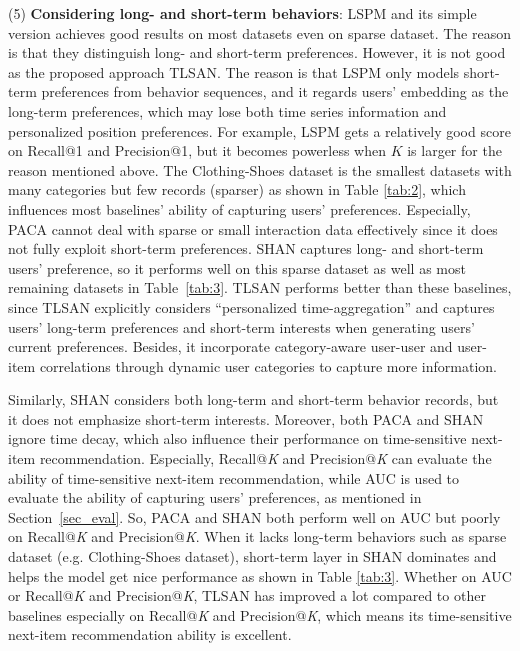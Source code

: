\documentclass[preprint,12pt]{elsarticle}
\newcommand{\tool}{TLSAN\xspace}
\begin{document}
\begin{sloppypar}
(5) \textbf{Considering long- and short-term behaviors}: LSPM and its simple version achieves good results on most datasets even on sparse dataset. The reason is that they distinguish long- and short-term preferences. However, it is not good as the proposed approach \tool. The reason is that LSPM only models short-term preferences from behavior sequences, and it regards users' embedding as the long-term preferences, which may lose both time series information and personalized position preferences. For example, LSPM gets a relatively good score on Recall@1 and Precision@1, but it becomes powerless when $K$ is larger for the reason mentioned above. The Clothing-Shoes dataset is the smallest datasets with many categories but few records (sparser) as shown in Table \ref{tab:2}, which influences most baselines' ability of capturing users' preferences. Especially, PACA cannot deal with sparse or small interaction data effectively since it does not fully exploit short-term preferences. SHAN captures long- and short-term users' preference, so it performs well on this sparse dataset as well as most remaining datasets in Table~\ref{tab:3}. \tool performs better than these baselines, since \tool explicitly considers ``personalized time-aggregation'' and captures users' long-term preferences and short-term interests when generating users' current preferences. Besides, it incorporate category-aware user-user and user-item correlations through dynamic user categories to capture more information. 

Similarly, SHAN considers both long-term and short-term behavior records, but it does not emphasize short-term interests. 
Moreover, both PACA and SHAN ignore time decay, which also influence their performance on time-sensitive next-item recommendation. Especially, Recall@\emph{K} and Precision@\emph{K} can evaluate the ability of time-sensitive next-item recommendation, while AUC is used to evaluate the ability of capturing users' preferences, as mentioned in Section~\ref{sec_eval}. So, PACA and SHAN both perform well on AUC but poorly on Recall@\emph{K} and Precision@\emph{K}. When it lacks long-term behaviors such as sparse dataset (e.g. Clothing-Shoes dataset), short-term layer in SHAN dominates and helps the model get nice performance as shown in Table \ref{tab:3}. Whether on AUC or Recall@\emph{K} and Precision@\emph{K}, \tool has improved a lot compared to other baselines especially on Recall@\emph{K} and Precision@\emph{K}, which means its time-sensitive next-item recommendation ability is excellent.


\end{sloppypar}
\end{document}
